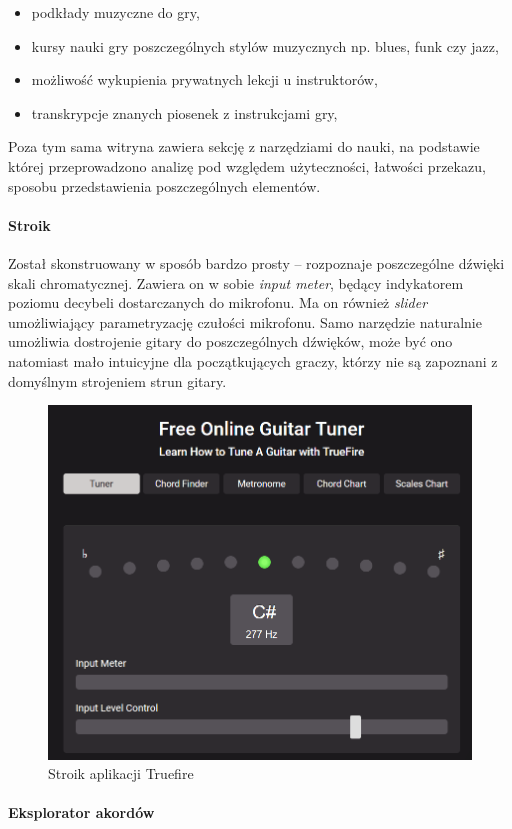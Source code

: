 \begin{itemize}
    \item podkłady muzyczne do gry,
    \item kursy nauki gry poszczególnych stylów muzycznych np. blues, funk czy jazz,
    \item możliwość wykupienia prywatnych lekcji u instruktorów,
    \item transkrypcje znanych piosenek z instrukcjami gry,
\end{itemize}

Poza tym sama witryna zawiera sekcję z narzędziami do nauki, na podstawie której przeprowadzono analizę pod względem użyteczności, łatwości przekazu, sposobu przedstawienia poszczególnych elementów. 

\paragraph{Stroik}

Został skonstruowany w sposób bardzo prosty -- rozpoznaje poszczególne dźwięki skali chromatycznej. Zawiera on w sobie \emph{input meter}, będący indykatorem poziomu decybeli dostarczanych do mikrofonu. Ma on również \emph{slider} umożliwiający parametryzację czułości mikrofonu. Samo narzędzie naturalnie umożliwia dostrojenie gitary do poszczególnych dźwięków, może być ono natomiast mało intuicyjne dla początkujących graczy, którzy nie są zapoznani z domyślnym strojeniem strun gitary.

\begin{figure}[htb]
	\centering
	\includegraphics[width=.6\linewidth]{rys02/tuneFireStroik}
	\caption{Stroik aplikacji Truefire} \label{fig:pageLayout}
\end{figure}

\paragraph{Eksplorator akordów}

